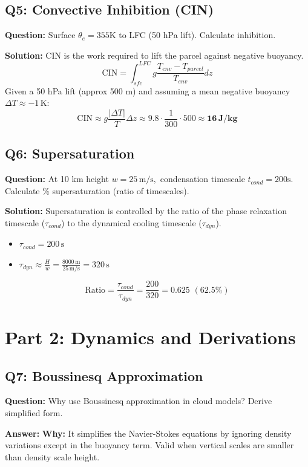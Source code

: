 \documentclass[11pt,a4paper]{article}
\begin{document}
\subsection*{Q5: Convective Inhibition (CIN)}
\textbf{Question:} Surface $\theta_e=355\text{K}$ to LFC (50 hPa lift). Calculate inhibition.

\textbf{Solution:}
CIN is the work required to lift the parcel against negative buoyancy.
\[ \text{CIN} = \int_{sfc}^{LFC} g \frac{T_{env} - T_{parcel}}{T_{env}} dz \]
Given a 50 hPa lift (approx 500 m) and assuming a mean negative buoyancy $\Delta T \approx -1\,\text{K}$:
\[ \text{CIN} \approx g \frac{|\Delta T|}{T} \Delta z \approx 9.8 \cdot \frac{1}{300} \cdot 500 \approx \mathbf{16\,\text{J/kg}} \]

\subsection*{Q6: Supersaturation}
\textbf{Question:} At 10 km height $w=25\,\text{m/s},$ condensation timescale $t_{cond}=200\text{s}.$ Calculate \% supersaturation (ratio of timescales).

\textbf{Solution:}
Supersaturation is controlled by the ratio of the phase relaxation timescale ($\tau_{cond}$) to the dynamical cooling timescale ($\tau_{dyn}$).
\begin{itemize}
    \item $\tau_{cond} = 200\,\text{s}$
    \item $\tau_{dyn} \approx \frac{H}{w} = \frac{8000\,\text{m}}{25\,\text{m/s}} = 320\,\text{s}$
\end{itemize}
\[ \text{Ratio} = \frac{\tau_{cond}}{\tau_{dyn}} = \frac{200}{320} = \mathbf{0.625 \,\, (62.5\%)} \]

\section*{Part 2: Dynamics and Derivations}

\subsection*{Q7: Boussinesq Approximation}
\textbf{Question:} Why use Boussinesq approximation in cloud models? Derive simplified form.

\textbf{Answer:}
\textbf{Why:} It simplifies the Navier-Stokes equations by ignoring density variations except in the buoyancy term. Valid when vertical scales are smaller than density scale height.
\end{document}
